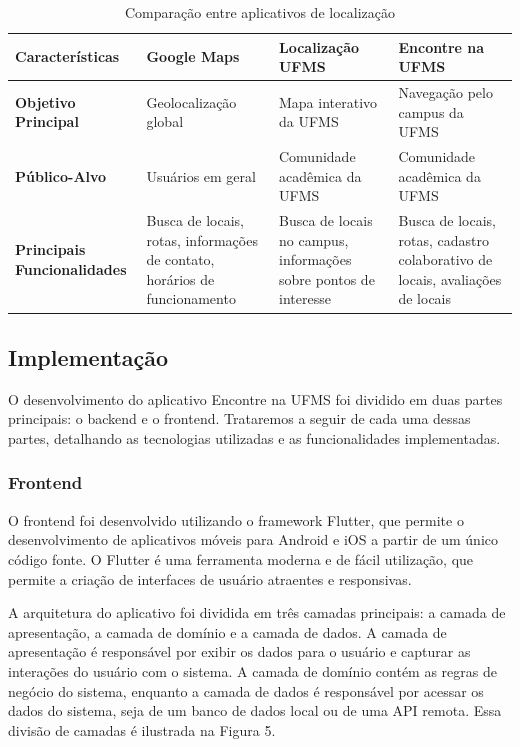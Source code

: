 \begin{table}[h]
    \begin{tabularx}{\textwidth}{|X|X|X|X|}
        \hline
        \textbf{Características} & \textbf{Google Maps} & \textbf{Localização UFMS} & \textbf{Encontre na UFMS} \\ \hline
        \textbf{Objetivo Principal} & Geolocalização global & Mapa interativo da UFMS & Navegação pelo campus da UFMS \\ \hline
        \textbf{Público-Alvo} & Usuários em geral & Comunidade acadêmica da UFMS & Comunidade acadêmica da UFMS \\ \hline
        \textbf{Principais Funcionalidades} & Busca de locais, rotas, informações de contato, horários de funcionamento & Busca de locais no campus, informações sobre pontos de interesse & Busca de locais, rotas, cadastro colaborativo de locais, avaliações de locais \\ \hline
    \end{tabularx}
    \caption{Comparação entre aplicativos de localização}
    \label{tab:comparacao-aplicativos}
\end{table}

\subsection{Implementação}

    O desenvolvimento do aplicativo Encontre na UFMS foi dividido em duas partes principais: o backend e o frontend. Trataremos a seguir de cada uma dessas partes, detalhando as tecnologias utilizadas e as funcionalidades implementadas.

\subsubsection{Frontend}

    O frontend foi desenvolvido utilizando o framework Flutter, que permite o desenvolvimento de aplicativos móveis para Android e iOS a partir de um único código fonte. O Flutter é uma ferramenta moderna e de fácil utilização, que permite a criação de interfaces de usuário atraentes e responsivas.

    A arquitetura do aplicativo foi dividida em três camadas principais: a camada de apresentação, a camada de domínio e a camada de dados. A camada de apresentação é responsável por exibir os dados para o usuário e capturar as interações do usuário com o sistema. A camada de domínio contém as regras de negócio do sistema, enquanto a camada de dados é responsável por acessar os dados do sistema, seja de um banco de dados local ou de uma API remota. Essa divisão de camadas é ilustrada na Figura 5.

